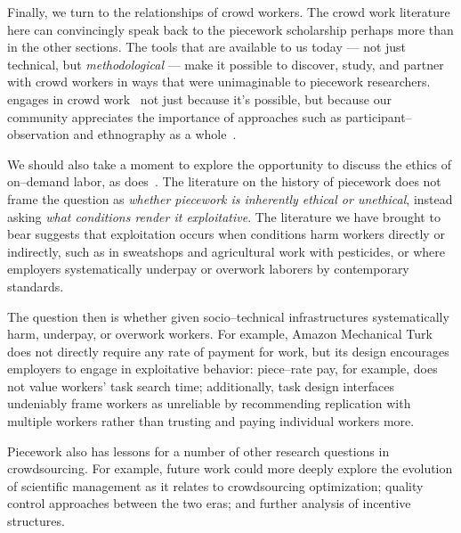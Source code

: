 \documentclass[trackingWork]{subfiles}
\begin{document}
Finally, we turn to the relationships of crowd workers.
The crowd work literature here can convincingly speak back to
the piecework scholarship perhaps more than in the other sections.
The tools that are available to us today
--- not just technical, but \textit{methodological} ---
make it possible to
discover, study, and partner with 
crowd workers in ways that were unimaginable to piecework researchers.
\citeauthor{bighamHalfWorkday} engages in crowd work~\cite{bighamHalfWorkday}
not just because it's possible, but because our community
appreciates the importance of approaches such as participant--observation and ethnography as a whole~\cite{olson2014ways}.

We should also take a moment to explore the opportunity to discuss the ethics of on--demand labor,
as \citeauthor{williamson2016} does~\cite{williamson2016}.
The literature on the history of piecework does not
frame the question as \textit{whether piecework is inherently ethical or unethical},
instead asking \textit{what conditions render it exploitative}.
The literature we have brought to bear suggests that exploitation occurs when
conditions harm workers directly or indirectly, such as
in sweatshops and agricultural work with pesticides, or where
employers systematically underpay or overwork laborers by contemporary standards.

The question then is
whether given socio--technical infrastructures 
systematically harm, underpay, or overwork workers.
For example, Amazon Mechanical Turk does not directly require any rate of payment for work,
but its design encourages employers to engage in exploitative behavior:
piece--rate pay, for example, does not value workers' task search time;
additionally, task design interfaces undeniably frame
workers as unreliable by recommending
replication with multiple workers rather than
trusting and paying individual workers more.


Piecework also has lessons for a number of other research questions in crowdsourcing.
For example, future work could more deeply explore the evolution of
scientific management as it relates to
crowdsourcing optimization;
quality control approaches between the two eras; and
further analysis of incentive structures.
\end{document}
